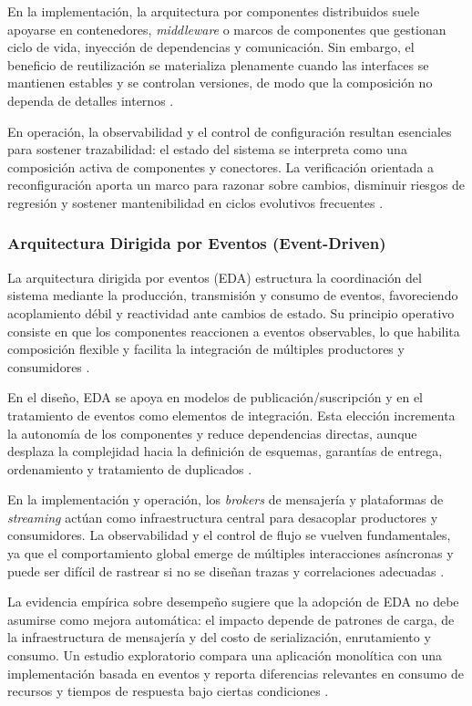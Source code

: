 			En la implementación, la arquitectura por componentes distribuidos suele apoyarse en contenedores, \textit{middleware} o marcos de componentes que gestionan ciclo de vida, inyección de dependencias y comunicación. Sin embargo, el beneficio de reutilización se materializa plenamente cuando las interfaces se mantienen estables y se controlan versiones, de modo que la composición no dependa de detalles internos \cite{CoullonEtAl2023CSUR}.
			
			En operación, la observabilidad y el control de configuración resultan esenciales para sostener trazabilidad: el estado del sistema se interpreta como una composición activa de componentes y conectores. La verificación orientada a reconfiguración aporta un marco para razonar sobre cambios, disminuir riesgos de regresión y sostener mantenibilidad en ciclos evolutivos frecuentes \cite{CoullonEtAl2023CSUR}.
			
		\subsubsection{Arquitectura Dirigida por Eventos (Event-Driven)}
			\noindent
			La arquitectura dirigida por eventos (EDA) estructura la coordinación del sistema mediante la producción, transmisión y consumo de eventos, favoreciendo acoplamiento débil y reactividad ante cambios de estado. Su principio operativo consiste en que los componentes reaccionen a eventos observables, lo que habilita composición flexible y facilita la integración de múltiples productores y consumidores \cite{Cabane2024Impact}.
			
			En el diseño, EDA se apoya en modelos de publicación/suscripción y en el tratamiento de eventos como elementos de integración. Esta elección incrementa la autonomía de los componentes y reduce dependencias directas, aunque desplaza la complejidad hacia la definición de esquemas, garantías de entrega, ordenamiento y tratamiento de duplicados \cite{Cabane2024Impact}.
			
			En la implementación y operación, los \textit{brokers} de mensajería y plataformas de \textit{streaming} actúan como infraestructura central para desacoplar productores y consumidores. La observabilidad y el control de flujo se vuelven fundamentales, ya que el comportamiento global emerge de múltiples interacciones asíncronas y puede ser difícil de rastrear si no se diseñan trazas y correlaciones adecuadas \cite{Cabane2024Impact}.
			
			La evidencia empírica sobre desempeño sugiere que la adopción de EDA no debe asumirse como mejora automática: el impacto depende de patrones de carga, de la infraestructura de mensajería y del costo de serialización, enrutamiento y consumo. Un estudio exploratorio compara una aplicación monolítica con una implementación basada en eventos y reporta diferencias relevantes en consumo de recursos y tiempos de respuesta bajo ciertas condiciones \cite{Cabane2024Impact}.
			
